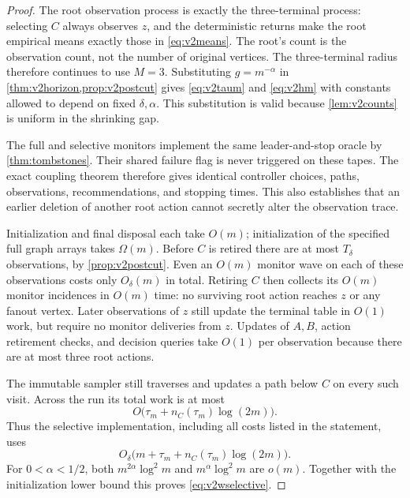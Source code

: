 \documentclass{article}
\theoremstyle{plain}
\theoremstyle{definition}
\begin{document}
\begin{proof}
The root observation process is exactly the three-terminal process:
selecting $C$ always observes $z$, and the deterministic returns make
the root empirical means exactly those in \eqref{eq:v2means}.
The root's count is the observation count, not the number of original
vertices. The three-terminal radius therefore continues to use $M=3$.
Substituting $g=m^{-\alpha}$ in
\cref{thm:v2horizon,prop:v2postcut} gives
\eqref{eq:v2taum} and \eqref{eq:v2hm} with constants allowed to depend
on fixed $\delta,\alpha$. This substitution is valid because
\cref{lem:v2counts} is uniform in the shrinking gap.

The full and selective monitors implement the same leader-and-stop
oracle by \cref{thm:tombstones}. Their shared failure flag is never
triggered on these tapes. The exact coupling theorem therefore gives
identical controller choices, paths, observations, recommendations,
and stopping times. This also establishes that an earlier deletion
of another root action cannot secretly alter the observation trace.

Initialization and final disposal each take $O(m)$; initialization of
the specified full graph arrays takes $\Omega(m)$. Before $C$ is
retired there are at most $T_\delta$ observations, by
\cref{prop:v2postcut}. Even an $O(m)$ monitor wave on each of these
observations costs only $O_\delta(m)$ in total. Retiring $C$ then
collects its $O(m)$ monitor incidences in $O(m)$ time: no surviving
root action reaches $z$ or any fanout vertex. Later observations of
$z$ still update the terminal table in $O(1)$ work, but require no
monitor deliveries from $z$. Updates of $A,B$, action retirement
checks, and decision queries take $O(1)$ per observation because
there are at most three root actions.

The immutable sampler still traverses and updates a path below $C$
on every such visit. Across the run its total work is at most
\[
 O\big(\tau_m+n_C(\tau_m)\log(2m)\big).
\]
Thus the selective implementation, including all costs listed in the
statement, uses
\begin{equation}
 O_\delta\big(m+\tau_m+n_C(\tau_m)\log(2m)\big).
 \label{eq:v2fullaccounting}
\end{equation}
For $0<\alpha<1/2$, both
$m^{2\alpha}\log^2m$ and $m^\alpha\log^2m$ are $o(m)$.
Together with the initialization lower bound this proves
\eqref{eq:v2wselective}.


\end{proof}
\end{document}

